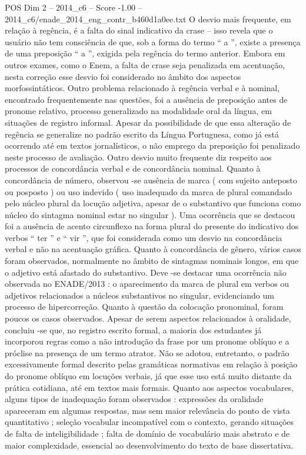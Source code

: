 \begin{textsample}{POS Dim 2 – 2014\_c6 – Score -1.00 – 2014\_c6/enade\_2014\_eng\_contr\_b460d1a0ee.txt}
O desvio mais frequente, em relação à regência, é a falta do sinal indicativo da crase – isso revela que o usuário não tem consciência de que, sob a forma do termo “ a ”, existe a presença de uma preposição “ a ”, exigida pela regência do termo anterior.
Embora em outros exames, como o Enem, a falta de crase seja penalizada em acentuação, nesta correção esse desvio foi considerado no âmbito dos aspectos morfossintáticos.
Outro problema relacionado à regência verbal e à nominal, encontrado frequentemente nas questões, foi a ausência de preposição antes de pronome relativo, processo generalizado na modalidade oral da língua, em situações de registro informal.
Apesar da possibilidade de que essa alteração de regência se generalize no padrão escrito da Língua Portuguesa, como já está ocorrendo até em textos jornalísticos, o não emprego da preposição foi penalizado neste processo de avaliação.
Outro desvio muito frequente diz respeito aos processos de concordância verbal e de concordância nominal.
Quanto à concordância de número, observou -se ausência de marca ( com sujeito anteposto ou posposto ) ou uso indevido ( uso inadequado da marca de plural comandado pelo núcleo plural da locução adjetiva, apesar de o substantivo que funciona como núcleo do sintagma nominal estar no singular ).
Uma ocorrência que se destacou foi a ausência de acento circunflexo na forma plural do presente do indicativo dos verbos “ ter ” e “ vir ”, que foi considerada como um desvio na concordância verbal e não na acentuação gráfica.
Quanto à concordância de gênero, vários casos foram observados, normalmente no âmbito de sintagmas nominais longos, em que o adjetivo está afastado do substantivo.
Deve -se destacar uma ocorrência não observada no ENADE/2013 : o aparecimento da marca de plural em verbos ou adjetivos relacionados a núcleos substantivos no singular, evidenciando um processo de hipercorreção.
Quanto à questão da colocação pronominal, foram poucos os casos observados.
Apesar de serem aspectos relacionados à oralidade, concluiu -se que, no registro escrito formal, a maioria dos estudantes já incorporou regras como a não introdução da frase por um pronome oblíquo e a próclise na presença de um termo atrator.
Não se adotou, entretanto, o padrão excessivamente formal descrito pelas gramáticas normativas em relação à posição do pronome oblíquo em locuções verbais, já que esse uso está muito distante da prática cotidiana, até em textos mais formais.
Quanto aos aspectos vocabulares, alguns tipos de inadequação foram observados : expressões da oralidade apareceram em algumas respostas, mas sem maior relevância do ponto de vista quantitativo ; seleção vocabular incompatível com o contexto, gerando situações de falta de inteligibilidade ; falta de domínio de vocabulário mais abstrato e de maior complexidade, essencial ao desenvolvimento do texto de base dissertativa.

\end{textsample}
